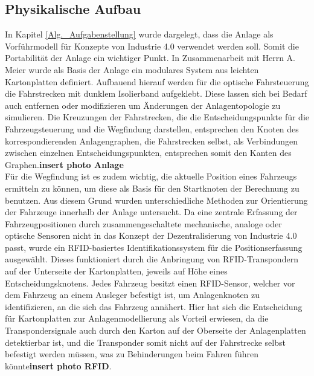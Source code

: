 		\subsection{Physikalische Aufbau}
			\label{Phys_Anlage}
			In Kapitel \ref{Alg._Aufgabenstellung} wurde dargelegt, dass die Anlage als Vorführmodell für Konzepte von Industrie 4.0  verwendet werden soll. Somit die Portabilität der Anlage ein wichtiger Punkt. In Zusammenarbeit mit Herrn A. Meier wurde als Basis der Anlage ein modulares System aus leichten Kartonplatten definiert. Aufbauend hierauf werden für die optische Fahrsteuerung die Fahrstrecken mit dunklem Isolierband aufgeklebt. Diese lassen sich bei Bedarf auch entfernen oder modifizieren um Änderungen der Anlagentopologie zu simulieren. Die Kreuzungen der Fahrstrecken, die die Entscheidungspunkte für die Fahrzeugsteuerung und die Wegfindung darstellen, entsprechen den Knoten des korrespondierenden Anlagengraphen, die Fahrstrecken selbst, als Verbindungen zwischen einzelnen Entscheidungspunkten, entsprechen somit den Kanten des Graphen.\textbf{insert photo Anlage}\\
			Für die Wegfindung ist es zudem wichtig, die aktuelle Position eines Fahrzeugs ermitteln zu können, um diese als Basis für den Startknoten der Berechnung zu benutzen. Aus diesem Grund wurden unterschiedliche Methoden zur Orientierung der Fahrzeuge innerhalb der Anlage untersucht. Da eine zentrale Erfassung der Fahrzeugpositionen durch zusammengeschaltete mechanische, analoge oder optische Sensoren nicht in das Konzept der Dezentralisierung von Industrie 4.0 passt, wurde ein \ac{RFID}-basiertes Identifikationssystem für die Positionserfassung ausgewählt. Dieses funktioniert durch die Anbringung von \ac{RFID}-Transpondern auf der Unterseite der Kartonplatten, jeweils auf Höhe eines Entscheidungsknotens. Jedes Fahrzeug besitzt einen \ac{RFID}-Sensor, welcher vor dem Fahrzeug an einem Ausleger befestigt ist, um Anlagenknoten zu identifizieren, an die sich das Fahrzeug annähert. Hier hat sich die Entscheidung für Kartonplatten zur Anlagenmodellierung als Vorteil erwiesen, da die Transpondersignale auch durch den Karton auf der Oberseite der Anlagenplatten detektierbar ist, und die Transponder somit nicht auf der Fahrstrecke selbst befestigt werden müssen, was zu Behinderungen beim Fahren führen könnte\textbf{insert photo RFID}.
			
